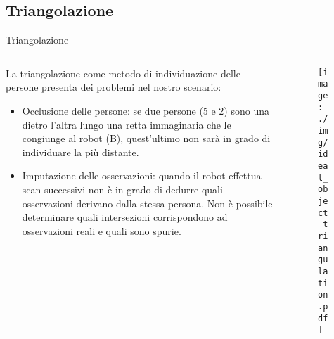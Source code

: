 \documentclass[10pt]{beamer}
\begin{document}
	\subsection{Triangolazione}\label{subsec:Triangolazione}
	\begin{frame}{Triangolazione}
		\begin{columns}
			\begin{column}{0.6\textwidth}
				\justifying
				La triangolazione come metodo di individuazione delle persone
				presenta dei problemi nel nostro scenario:
				\begin{itemize}
					\justifying
					\item Occlusione delle persone: se due persone
						(5 e 2) sono una dietro l'altra lungo una retta
						immaginaria che le congiunge al robot (B), quest'ultimo
						non sarà in grado di individuare la più distante. 

					\item Imputazione delle osservazioni: quando il robot
						effettua scan successivi non è in grado di dedurre
						quali osservazioni derivano dalla stessa persona.
						Non è possibile determinare quali intersezioni
						corrispondono ad osservazioni reali e quali sono spurie. 

				\end{itemize}
			\end{column}
			
			\begin{column}{0.4\textwidth}
				\begin{figure}[htpb]
					\centering
					\texttt{[image: ./img/ideal\_object\_triangulation.pdf]}
					\label{fig:triangulation}
				\end{figure}
			\end{column}
		\end{columns}
	\end{frame}
	
\end{document}
